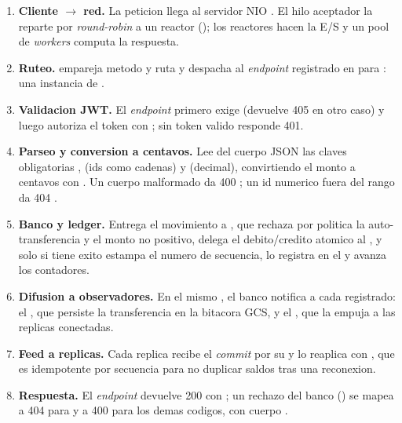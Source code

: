 \begin{enumerate}
  \item \textbf{Cliente $\rightarrow$ red.} La peticion llega al servidor NIO
        . El hilo aceptador la reparte por
        \emph{round-robin} a un reactor (); los reactores
        hacen la E/S y un pool de \emph{workers} computa la respuesta.
  \item \textbf{Ruteo.}  empareja metodo y ruta y
        despacha al \emph{endpoint} registrado en  para
        : una instancia de
        .
  \item \textbf{Validacion JWT.} El \emph{endpoint} primero exige
         (devuelve 405 en otro caso) y luego autoriza el token con
        ; sin token valido responde 401.
  \item \textbf{Parseo y conversion a centavos.} Lee del cuerpo JSON las claves
        obligatorias ,  (ids como
        cadenas) y  (decimal), convirtiendo el monto a centavos
        con . Un cuerpo malformado da 400
        ; un id numerico fuera del rango  da 404
        .
  \item \textbf{Banco y ledger.} Entrega el movimiento a
        , que rechaza por politica la
        auto-transferencia y el monto no positivo, delega el debito/credito atomico
        al , y solo si tiene exito estampa el numero de
        secuencia, lo registra en el  y avanza los
        contadores.
  \item \textbf{Difusion a observadores.} En el mismo , el banco
        notifica a cada  registrado: el
        , que persiste la transferencia en la
        bitacora GCS, y el , que la empuja a las
        replicas conectadas.
  \item \textbf{Feed a replicas.} Cada replica recibe el \emph{commit} por su
         y lo reaplica con
        , que es idempotente por secuencia para no
        duplicar saldos tras una reconexion.
  \item \textbf{Respuesta.} El \emph{endpoint} devuelve 200 con
        ; un rechazo del banco
        () se mapea a 404 para 
        y a 400 para los demas codigos, con cuerpo .
\end{enumerate}

